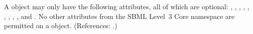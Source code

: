 A \Model object may only have the following attributes, all of which are
optional: , , , ,
, , ,
, ,  and
.  No other attributes from the SBML Level~3 Core
namespace are permitted on a \Model object.  (References: .)
